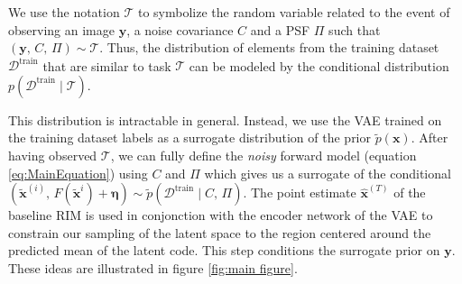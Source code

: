 \documentclass[twocolumn]{aastex631}
\begin{document}



We use the notation $\mathcal{T}$ to 
symbolize the random variable related to the event 
of observing an image $\mathbf{y}$, a noise covariance $C$ 
and a PSF $\Pi$ such that $(\mathbf{y},\,C,\,\Pi) \sim \mathcal{T}$.
Thus, the distribution of elements 
from the training dataset $\mathcal{D}^{\mathrm{train}}$ 
that are similar to task $\mathcal{T}$ can be 
modeled by the conditional distribution 
$p(\mathcal{D}^{\mathrm{train}} \mid \mathcal{T})$.

This distribution is intractable in general. Instead, we 
use the VAE trained on the training dataset labels as a surrogate 
distribution of the prior $\tilde{p}(\mathbf{x})$.  
After having observed $\mathcal{T}$, we can fully define 
the \textit{noisy} forward model (equation \eqref{eq:MainEquation}) 
using $C$ and $\Pi$ which gives us a surrogate of 
the conditional 
${(\tilde{\mathbf{x}}^{(i)},\, F(\tilde{\mathbf{x}}^{i}) + \boldsymbol{\eta}) \sim \tilde{p}(\mathcal{D}^{\mathrm{train}} \mid C,\, \Pi)}$.
The point estimate $\mathbf{\hat{x}}^{(T)}$ of the baseline RIM 
is used in conjonction with the encoder network of the VAE to 
constrain our sampling of the latent space 
to the region centered around the predicted mean of the latent code. 
This step 
conditions the surrogate prior on $\mathbf{y}$.
These ideas are 
illustrated in figure \ref{fig:main figure}. 


\end{document}
